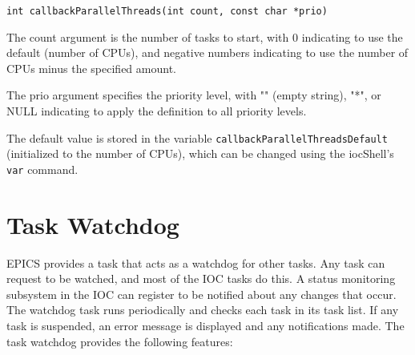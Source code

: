 \begin{verbatim}
int callbackParallelThreads(int count, const char *prio)
\end{verbatim}

The count argument is the number of tasks to start, with 0 indicating to use the default (number of CPUs), and negative numbers indicating to use the number of CPUs minus the specified amount.

The prio argument specifies the priority level, with "" (empty string), "*", or NULL indicating to apply the definition to all priority levels.

The default value is stored in the variable \verb|callbackParallelThreadsDefault| (initialized to the number of CPUs), which can be changed using the iocShell's \verb|var| command.

\section{Task Watchdog}
\label{Task Watchdog}

EPICS provides a task that acts as a watchdog for other tasks. Any task can request to be watched, and most of the IOC 
tasks do this. A status monitoring subsystem in the IOC can register to be notified about any changes that occur. The 
watchdog task runs periodically and checks each task in its task list. If any task is suspended, an error message is 
displayed and any notifications made. The task watchdog provides the following features:

